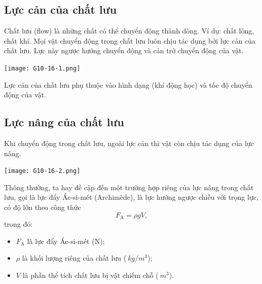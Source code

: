 \subsection{Lực cản của chất lưu}
Chất lưu (flow) là những chất có thể chuyển động thành dòng. Ví dụ: chất lỏng, chất khí.
Mọi vật chuyển động trong chất lưu luôn chịu tác dụng bởi lực cản của chất lưu. Lực này ngược hướng chuyển động và cản trở chuyển động của vật.
\begin{center}
	\texttt{[image: G10-16-1.png]}
\end{center}
Lực cản của chất lưu phụ thuộc vào hình dạng (khí động học) và tốc độ chuyển động của vật.
\subsection{Lực nâng của chất lưu}
Khi chuyển động trong chất lưu, ngoài lực cản thì vật còn chịu tác dụng của lực nâng.
\begin{center}
	\texttt{[image: G10-16-2.png]}
\end{center}
Thông thường, ta hay đề cập đến một trường hợp riêng của lực nâng trong chất lưu, gọi là lực đẩy Ác-si-mét (Archimède), là lực hướng ngược chiều với trọng lực, có độ lớn theo công thức
$$F_\text{A} = \rho g V,$$
trong đó:
\begin{itemize}
	\item $F_\text{A}$ là lực đẩy Ác-si-mét (N);
	\item $\rho$ là khối lượng riêng của chất lưu ($\SI{}{kg/m^3}$);
	\item $V$ là phần thể tích chất lưu bị vật chiếm chỗ ($\SI{}{m^3}$).
\end{itemize}
